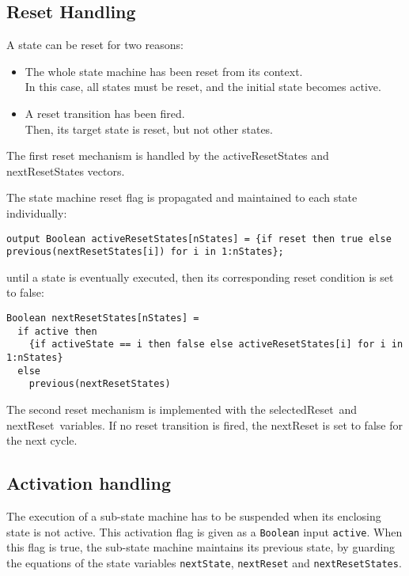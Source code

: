 \subsection{Reset Handling}\label{reset-handling}

A state can be reset for two reasons:
\begin{itemize}
\item
  The whole state machine has been reset from its context.\\
  In this case, all states must be reset, and the initial state becomes
  active.
\item
  A reset transition has been fired.\\
  Then, its target state is reset, but not other states.
\end{itemize}

The first reset mechanism is handled by the activeResetStates and
nextResetStates vectors.

The state machine reset flag is propagated and maintained to each state
individually:
\begin{lstlisting}[language=modelica]
output Boolean activeResetStates[nStates] = {if reset then true else previous(nextResetStates[i]) for i in 1:nStates};
\end{lstlisting}
until a state is eventually executed, then its corresponding reset
condition is set to false:
\begin{lstlisting}[language=modelica]
Boolean nextResetStates[nStates] =
  if active then
    {if activeState == i then false else activeResetStates[i] for i in 1:nStates}
  else
    previous(nextResetStates)
\end{lstlisting}
The second reset mechanism is implemented with the selectedReset~and
nextReset~variables. If no reset transition is fired, the nextReset is
set to false for the next cycle.

\subsection{Activation handling}\label{activation-handling}

The execution of a sub-state machine has to be suspended when its
enclosing state is not active. This activation flag is given as a
\lstinline!Boolean! input \lstinline!active!. When this flag is true, the sub-state machine
maintains its previous state, by guarding the equations of the state
variables \lstinline!nextState!, \lstinline!nextReset! and \lstinline!nextResetStates!.


